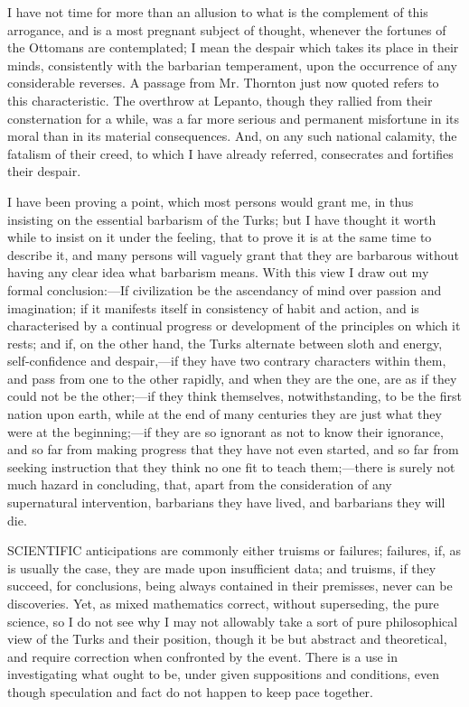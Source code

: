 I have not time for more than
an allusion to what is the complement of this arrogance, and is a most
pregnant subject of thought, whenever the fortunes of the Ottomans are
contemplated; I mean the despair which takes its place in their minds,
consistently with the barbarian temperament, upon the occurrence of
any considerable reverses. A passage from Mr. Thornton just now quoted
refers to this characteristic. The overthrow at Lepanto, though they
rallied from their consternation for a while, was a far more serious
and permanent misfortune in its moral than in its material
consequences. And, on any such national calamity, the fatalism of
their creed, to which I have already referred, consecrates and
fortifies their despair.

I have been proving a point,
which most persons would grant me, in thus insisting on the essential
barbarism of the Turks; but I have thought it worth while to insist on
it under the feeling, that to prove it is at the same time to describe
it, and many persons will vaguely grant that they are barbarous
without having any clear idea what barbarism means. With this view I
draw out my formal conclusion:—If civilization be the ascendancy of
mind over passion and imagination; if it manifests itself in
consistency of habit and action, and is characterised by a continual
progress or development of the principles on which it rests; and if,
on the other hand, the Turks alternate between sloth and energy,
self-confidence and despair,—if they have two contrary characters
within them, and pass from one to the other rapidly, and when they are
the one, are as if they could not be the other;—if they think
themselves, notwithstanding, to be the first nation upon earth, while
at the end of many centuries they are just what they were at the
beginning;—if they are so ignorant as not to know their ignorance,
and so far from making progress that they have not even started, and
so far from seeking instruction that they think no one fit to teach
them;—there is surely not much hazard in concluding, that, apart
from the consideration of any supernatural intervention, barbarians
they have lived, and barbarians they will die.


SCIENTIFIC
anticipations are commonly either truisms or failures; failures, if,
as is usually the case, they are made upon insufficient data; and
truisms, if they succeed, for conclusions, being always contained in
their premisses, never can be discoveries. Yet, as mixed mathematics
correct, without superseding, the pure science, so I do not see why I
may not allowably take a sort of pure philosophical view of the Turks
and their position, though it be but abstract and theoretical, and
require correction when confronted by the event. There is a use in
investigating what ought to be, under given suppositions and
conditions, even though speculation and fact do not happen to keep
pace together.

